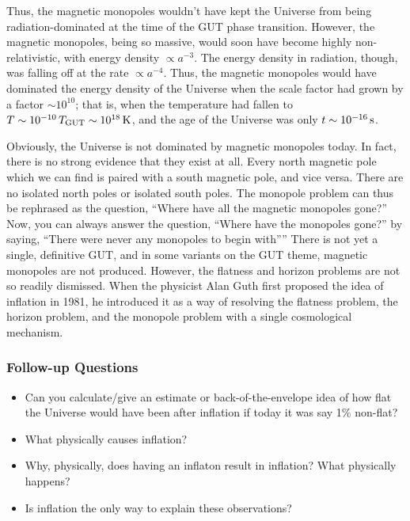 \documentclass[a4paper,11pt]{article}
\begin{document}
{\noindent}Thus, the magnetic monopoles wouldn't have kept the Universe from being radiation-dominated at the time of the GUT phase transition. However, the magnetic monopoles, being so massive, would soon have become highly non-relativistic, with energy density $\propto a^{-3}$. The energy density in radiation, though, was falling off at the rate $\propto a^{-4}$. Thus, the magnetic monopoles would have dominated the energy density of the Universe when the scale factor had grown by a factor $\sim10^{10}$; that is, when the temperature had fallen to $T\sim10^{-10}\,T_\mathrm{GUT}\sim10^{18}\,{\rm K}$, and the age of the Universe was only $t\sim10^{-16}\,{\rm s}$.

{\noindent}Obviously, the Universe is not dominated by magnetic monopoles today. In fact, there is no strong evidence that they exist at all. Every north magnetic pole which we can find is paired with a south magnetic pole, and vice versa. There are no isolated north poles or isolated south poles. The monopole problem can thus be rephrased as the question, ``Where have all the magnetic monopoles gone?'' Now, you can always answer the question, ``Where have the monopoles gone?'' by saying, ``There were never any monopoles to begin with''” There is not yet a single, definitive GUT, and in some variants on the GUT theme, magnetic monopoles are not produced. However, the flatness and horizon problems are not so readily dismissed. When the physicist Alan Guth first proposed the idea of inflation in 1981, he introduced it as a way of resolving the flatness problem, the horizon problem, and the monopole problem with a single cosmological mechanism.

\subsubsection{Follow-up Questions}

\begin{itemize}
    \item Can you calculate/give an estimate or back-of-the-envelope idea of how flat the Universe would have been after inflation if today it was say 1\% non-flat?
    \item What physically causes inflation?
    \item Why, physically, does having an inflaton result in inflation? What physically happens?
    \item Is inflation the only way to explain these observations?

\end{itemize}
\end{document}
